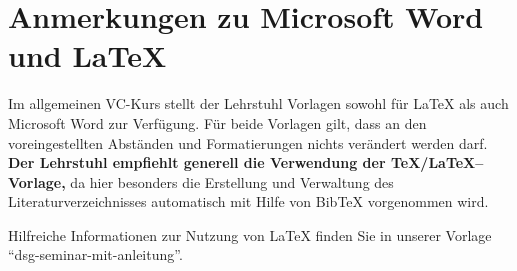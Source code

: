 \section{Anmerkungen zu Microsoft Word und \LaTeX}


Im allgemeinen VC-Kurs stellt der Lehrstuhl Vorlagen sowohl für LaTeX als auch Microsoft Word zur Verfügung. Für beide Vorlagen gilt, dass an den voreingestellten Abständen und Formatierungen
nichts verändert werden darf. 
\textbf{Der Lehrstuhl empfiehlt generell die Verwendung der TeX/LaTeX--Vorlage, }
da hier besonders die Erstellung und Verwaltung des Literaturverzeichnisses
automatisch mit Hilfe von BibTeX vorgenommen wird.

Hilfreiche Informationen zur Nutzung von LaTeX finden Sie in unserer Vorlage "`dsg-seminar-mit-anleitung"'.
%
